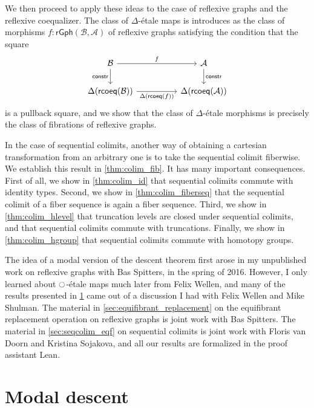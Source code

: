 We then proceed to apply these ideas to the case of reflexive graphs and the reflexive coequalizer. The class of $\Delta$-\'etale maps is introduces as the class of morphisms $f:\mathsf{rGph}(\mathcal{B},\mathcal{A})$ of reflexive graphs satisfying the condition that the square
\begin{equation*}
\begin{tikzcd}[column sep=huge]
\mathcal{B} \arrow[r,"f"] \arrow[d,swap,"\mathsf{constr}"] & \mathcal{A} \arrow[d,"\mathsf{constr}"] \\
\Delta(\mathsf{rcoeq}(\mathcal{B})) \arrow[r,swap,"\Delta(\mathsf{rcoeq}(f))"] & \Delta(\mathsf{rcoeq}(\mathcal{A}))
\end{tikzcd}
\end{equation*}
is a pullback square, and we show that the class of $\Delta$-\'etale morphisms is precisely the class of fibrations of reflexive graphs. 

In the case of sequential colimits, another way of obtaining a cartesian transformation from an arbitrary one is to take the sequential colimit fiberwise. We establish this result in \cref{thm:colim_fib}. It has many important consequences. First of all, we show in \cref{thm:colim_id} that sequential colimits commute with identity types. Second, we show in \cref{thm:colim_fiberseq} that the sequential colimit of a fiber sequence is again a fiber sequence. Third, we show in \cref{thm:colim_hlevel} that truncation levels are closed under sequential colimits, and that sequential colimits commute with truncations. Finally, we show in \cref{thm:colim_hgroup} that sequential colimits commute with homotopy groups. 

The idea of a modal version of the descent theorem first arose in my unpublished work on reflexive graphs with Bas Spitters, in the spring of 2016. However, I only learned about ${\ocircle}$-\'etale maps much later from Felix Wellen, and many of the results presented in \cref{sec:modal_descent} came out of a discussion I had with Felix Wellen and Mike Shulman. 
The material in \cref{sec:equifibrant_replacement} on the equifibrant replacement operation on reflexive graphs is joint work with Bas Spitters. 
The material in \cref{sec:seqcolim_eqf} on sequential colimits is joint work with Floris van Doorn and Kristina Sojakova, and all our results are formalized in the proof assistant Lean. 

\section{Modal descent}\label{sec:modal_descent}

